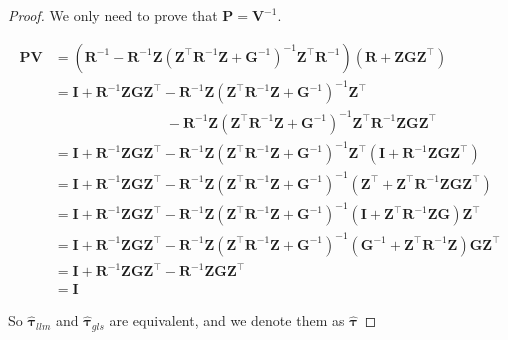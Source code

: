 \documentclass[
  a4paper,
  oneside,
  openany,
  12pt,
  onecolumn]{book}
\theoremstyle{plain}
\theoremstyle{definition}
\theoremstyle{remark}
\begin{document}
\begin{proof}
We only need to prove that \(\boldsymbol{P}=\boldsymbol{V}^{-1}\).

\[\begin{aligned}
\boldsymbol{P}\boldsymbol{V} &=(\boldsymbol{R}^{-1}-\boldsymbol{R}^{-1}\boldsymbol{Z}(\boldsymbol{Z}^\top\boldsymbol{R}^{-1}\boldsymbol{Z}+\boldsymbol{G}^{-1})^{-1}\boldsymbol{Z}^\top\boldsymbol{R}^{-1})(\boldsymbol{R}+\boldsymbol{Z}\boldsymbol{G}\boldsymbol{Z}^\top)\\
&= \boldsymbol{I} + \boldsymbol{R}^{-1}\boldsymbol{Z}\boldsymbol{G}\boldsymbol{Z}^\top - \boldsymbol{R}^{-1}\boldsymbol{Z}(\boldsymbol{Z}^\top\boldsymbol{R}^{-1}\boldsymbol{Z}+\boldsymbol{G}^{-1})^{-1}\boldsymbol{Z}^\top \\
&\quad \quad \quad \quad \quad \quad\quad\quad -\boldsymbol{R}^{-1}\boldsymbol{Z}(\boldsymbol{Z}^\top\boldsymbol{R}^{-1}\boldsymbol{Z}+\boldsymbol{G}^{-1})^{-1}\boldsymbol{Z}^\top\boldsymbol{R}^{-1}\boldsymbol{Z}\boldsymbol{G}\boldsymbol{Z}^\top\\
&=\boldsymbol{I} + \boldsymbol{R}^{-1}\boldsymbol{Z}\boldsymbol{G}\boldsymbol{Z}^\top -\boldsymbol{R}^{-1}\boldsymbol{Z}(\boldsymbol{Z}^\top\boldsymbol{R}^{-1}\boldsymbol{Z}+\boldsymbol{G}^{-1})^{-1}\boldsymbol{Z}^\top(\boldsymbol{I}+\boldsymbol{R}^{-1}\boldsymbol{Z}\boldsymbol{G}\boldsymbol{Z}^\top)\\
&=\boldsymbol{I} + \boldsymbol{R}^{-1}\boldsymbol{Z}\boldsymbol{G}\boldsymbol{Z}^\top -\boldsymbol{R}^{-1}\boldsymbol{Z}(\boldsymbol{Z}^\top\boldsymbol{R}^{-1}\boldsymbol{Z}+\boldsymbol{G}^{-1})^{-1}(\boldsymbol{Z}^\top+\boldsymbol{Z}^\top\boldsymbol{R}^{-1}\boldsymbol{Z}\boldsymbol{G}\boldsymbol{Z}^\top)\\
&= \boldsymbol{I} + \boldsymbol{R}^{-1}\boldsymbol{Z}\boldsymbol{G}\boldsymbol{Z}^\top -\boldsymbol{R}^{-1}\boldsymbol{Z}(\boldsymbol{Z}^\top\boldsymbol{R}^{-1}\boldsymbol{Z}+\boldsymbol{G}^{-1})^{-1}(\boldsymbol{I}+\boldsymbol{Z}^\top\boldsymbol{R}^{-1}\boldsymbol{Z}\boldsymbol{G})\boldsymbol{Z}^\top\\
&= \boldsymbol{I} + \boldsymbol{R}^{-1}\boldsymbol{Z}\boldsymbol{G}\boldsymbol{Z}^\top -\boldsymbol{R}^{-1}\boldsymbol{Z}(\boldsymbol{Z}^\top\boldsymbol{R}^{-1}\boldsymbol{Z}+\boldsymbol{G}^{-1})^{-1}(\boldsymbol{G}^{-1}+\boldsymbol{Z}^\top\boldsymbol{R}^{-1}\boldsymbol{Z})\boldsymbol{G}\boldsymbol{Z}^\top\\
&= \boldsymbol{I}+\boldsymbol{R}^{-1}\boldsymbol{Z}\boldsymbol{G}\boldsymbol{Z}^\top-\boldsymbol{R}^{-1}\boldsymbol{Z}\boldsymbol{G}\boldsymbol{Z}^\top\\
& = \boldsymbol{I}
\end{aligned}\]

So \(\hat{\boldsymbol{\tau}}_{llm}\) and
\(\hat{\boldsymbol{\tau}}_{gls}\) are equivalent, and we denote them as
\(\hat{\boldsymbol{\tau}}\)
\end{proof}
\end{document}
